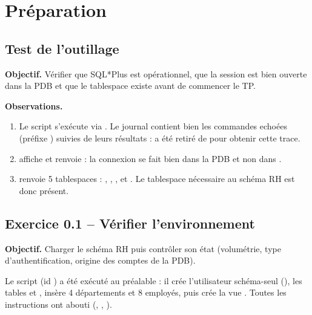 \section{Préparation}

\subsection{Test de l'outillage}
\textbf{Objectif.} Vérifier que SQL*Plus est opérationnel, que la session est bien ouverte dans la PDB
 et que le tablespace  existe avant de commencer le TP.


\textbf{Observations.}
\begin{enumerate}
  \item Le script s'exécute via . Le journal
         contient bien les commandes echoées (préfixe ) suivies de
        leurs résultats :  a été retiré de  pour obtenir cette trace.
  \item {} affiche  et  renvoie  :
        la connexion  se fait bien dans la PDB et non dans .
  \item {} renvoie 5 tablespaces :
        , , ,  et . Le tablespace
         nécessaire au schéma RH est donc présent.
\end{enumerate}

\subsection{Exercice 0.1 -- Vérifier l'environnement}
\textbf{Objectif.} Charger le schéma RH puis contrôler son état (volumétrie, type d'authentification,
origine des comptes de la PDB).

Le script  (id ) a été exécuté au préalable : il crée
l'utilisateur schéma-seul  (), les tables  et
, insère 4 départements et 8 employés, puis crée la vue . Toutes les
instructions ont abouti (, , ).


